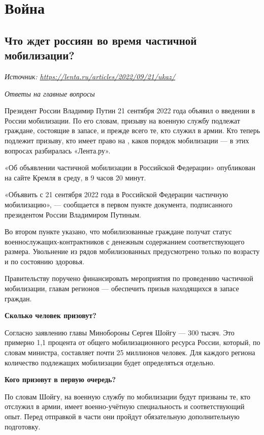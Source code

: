 \chapter{Война}

\section{Что ждет россиян во время частичной мобилизации?}
\textit{Источник: \url{https://lenta.ru/articles/2022/09/21/ukaz/}}

\textit{Ответы на главные вопросы}

Президент России Владимир Путин 21 сентября 2022 года объявил о введении в России  мобилизации. По его словам, призыву на военную службу подлежат граждане, состоящие в запасе, и прежде всего те, кто служил в армии. Кто теперь подлежит призыву, кто имеет право на , каков порядок мобилизации — в этих вопросах разбиралась «Лента.ру».

 «Об объявлении частичной мобилизации в Российской Федерации» опубликован на сайте Кремля в среду, в 9 часов 20 минут.

«Объявить с 21 сентября 2022 года в Российской Федерации частичную мобилизацию», — сообщается в первом пункте документа, подписанного президентом России Владимиром Путиным.

Во втором пункте указано, что мобилизованные граждане получат статус военнослужащих-контрактников с денежным содержанием соответствующего размера. Увольнение из рядов мобилизованных предусмотрено только по возрасту и по состоянию здоровья.

Правительству поручено финансировать мероприятия по проведению частичной мобилизации, главам регионов — обеспечить призыв находящихся в запасе граждан.

\textbf{Сколько человек призовут?}

Согласно заявлению главы Минобороны Сергея Шойгу — 300 тысяч. Это примерно 1,1 процента от общего мобилизационного ресурса России, который, по словам министра, составляет почти 25 миллионов человек. Для каждого региона количество подлежащих мобилизации будет определяться отдельно.

\textbf{Кого призовут в первую очередь?}

По словам Шойгу, на военную службу по мобилизации будут призваны те, кто отслужил в армии, имеет военно-учётную специальность и соответствующий опыт. Перед отправкой в части они пройдут обязательную дополнительную подготовку.

